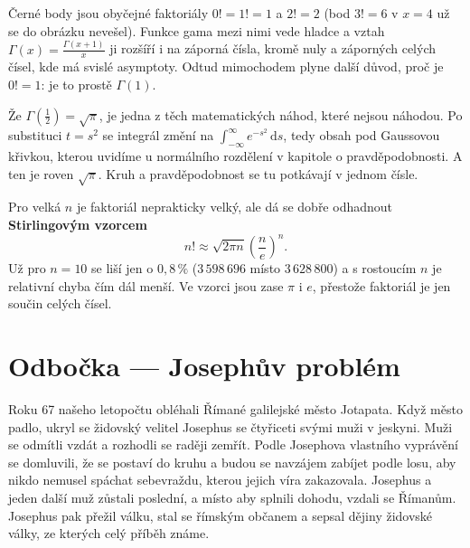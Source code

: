 Černé body jsou obyčejné faktoriály $0! = 1! = 1$ a $2! = 2$ (bod $3! = 6$ v $x = 4$ už se do obrázku nevešel). Funkce gama mezi nimi vede hladce a vztah $\Gamma(x) = \frac{\Gamma(x + 1)}{x}$ ji rozšíří i na záporná čísla, kromě nuly a záporných celých čísel, kde má svislé asymptoty. Odtud mimochodem plyne další důvod, proč je $0! = 1$: je to prostě $\Gamma(1)$.

Že $\Gamma\left(\frac{1}{2}\right) = \sqrt{\pi}$, je jedna z těch matematických náhod, které nejsou náhodou. Po substituci $t = s^2$ se integrál změní na $\int_{-\infty}^{\infty}e^{-s^2}\,\mathrm{d}s$, tedy obsah pod Gaussovou křivkou, kterou uvidíme u normálního rozdělení v kapitole o pravděpodobnosti. A ten je roven $\sqrt{\pi}$. Kruh a pravděpodobnost se tu potkávají v jednom čísle.

\begin{note}
  Pro velká $n$ je faktoriál neprakticky velký, ale dá se dobře odhadnout \textbf{Stirlingovým vzorcem}
  \begin{equation*}
    n!\approx\sqrt{2\pi n}{\left(\frac{n}{e}\right)}^n.
  \end{equation*}
  Už pro $n = 10$ se liší jen o $0{,}8\,\%$ ($3\,598\,696$ místo $3\,628\,800$) a s rostoucím $n$ je relativní chyba čím dál menší. Ve vzorci jsou zase $\pi$ i $e$, přestože faktoriál je jen součin celých čísel.
\end{note}

\section{Odbočka --- Josephův problém}

Roku 67 našeho letopočtu obléhali Římané galilejské město Jotapata. Když město padlo, ukryl se židovský velitel Josephus se čtyřiceti svými muži v jeskyni. Muži se odmítli vzdát a rozhodli se raději zemřít. Podle Josephova vlastního vyprávění se domluvili, že se postaví do kruhu a budou se navzájem zabíjet podle losu, aby nikdo nemusel spáchat sebevraždu, kterou jejich víra zakazovala. Josephus a jeden další muž zůstali poslední, a místo aby splnili dohodu, vzdali se Římanům. Josephus pak přežil válku, stal se římským občanem a sepsal dějiny židovské války, ze kterých celý příběh známe.


